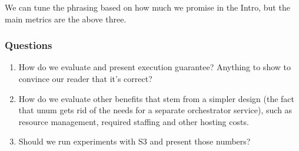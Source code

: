 We can tune the phrasing based on how much we promise in the Intro, but the
main metrics are the above three.

\subsubsection{Questions}

\begin{enumerate}

    \item How do we evaluate and present execution guarantee? Anything to show
     to convince our reader that it's correct?

    \item How do we evaluate other benefits that stem from a simpler design
     (the fact that unum gets rid of the needs for a separate orchestrator
     service), such as resource management, required staffing and other
     hosting costs.

    \item Should we run experiments with S3 and present those numbers?

\end{enumerate}

